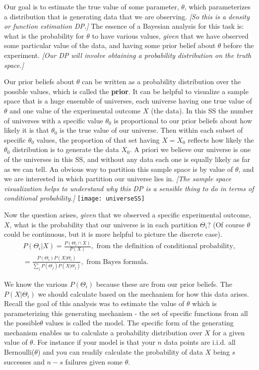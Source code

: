 Our goal is to estimate the true value of some parameter, $\theta$, which parameterizes a distribution that is generating data that we are observing.  \emph{[So this is a density or function estimation DP.]} The essence of a Bayesian analysis for this task is: what is the probability for $\theta$ to have various values, \textit{given} that we have observed some particular value of the data, and having some prior belief about $\theta$ before the experiment. \emph{[Our DP will involve obtaining a probability distribution on the truth space.]}
\nn

Our prior beliefs about $\theta$ can be written as a probability distribution over the possible values, which is called the \textbf{prior}. It can be helpful to visualize a sample space that is a huge ensemble of universes, each universe having one true value of $\theta$ and one value of the experimental outcome $X$ (the data). In this SS the number of universes with a specific value $\theta_0$ is proportional to our prior beliefs about how likely it is that $\theta_0$ is the true value of our universe. Then within each subset of specific $\theta_0$ values, the proportion of that set having $X=X_0$ reflects how likely the $\theta_0$ distribution is to generate the data $X_0$.  A priori we believe our universe is one of the universes in this SS, and without any data each one is equally likely as far as we can tell. An obvious way to partition this sample space is by value of $\theta$, and we are interested in which partition our universe lies in. \emph{[The sample space visualization helps to understand why this DP is a sensible thing to do in terms of conditional probability.]}
\nn
\texttt{[image: universeSS]}
\nn

Now the question arises, \textit{given} that we observed a specific experimental outcome, $X$, what is the probability that our universe is in each partition $\Theta_i$? (Of course $\theta$ could be continuous, but it is more helpful to picture the discrete case).
\begin{align}
P(\Theta_i|X) = \frac{P(\Theta_i\cap X)}{P(X)}, \textrm{ from the definition of conditional probability,}\\
= \frac{P(\Theta_i)P(X|\Theta_i)}{\sum_jP(\Theta_j)P(X|\Theta_j)}, \textrm{ from Bayes formula}.
\end{align}

We know the various $P(\Theta_i)$ because these are from our prior beliefs. The $P(X|\Theta_i)$ we should calculate based on the mechanism for how this data arises. Recall the goal of this analysis was to estimate the value of $\theta$ which is parameterizing this generating mechanism - the set of specific functions from all the possible$\theta$ values is called the model. The specific form of the generating mechanism enables us to calculate a probability distribution over $X$ for a given value of $\theta$. For instance if your model is that your $n$ data points are i.i.d. all Bernoulli($\theta$) and you can readily calculate the probability of data $X$ being $s$ successes and $n-s$ failures given some $\theta$.
\nn

